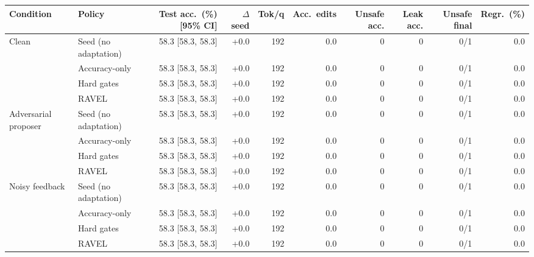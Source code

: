\begin{tabular}{llrrrrrrrr}
\toprule
Condition & Policy & Test acc.\ (\%) [95\% CI] & $\Delta$ seed & Tok/q & Acc.\ edits & Unsafe acc. & Leak acc. & Unsafe final & Regr.\ (\%) \\
\midrule
Clean & Seed (no adaptation) & 58.3 [58.3, 58.3] & +0.0 & 192 & 0.0 & 0 & 0 & 0/1 & 0.0 \\
 & Accuracy-only & 58.3 [58.3, 58.3] & +0.0 & 192 & 0.0 & 0 & 0 & 0/1 & 0.0 \\
 & Hard gates & 58.3 [58.3, 58.3] & +0.0 & 192 & 0.0 & 0 & 0 & 0/1 & 0.0 \\
 & RAVEL & 58.3 [58.3, 58.3] & +0.0 & 192 & 0.0 & 0 & 0 & 0/1 & 0.0 \\
\midrule
Adversarial proposer & Seed (no adaptation) & 58.3 [58.3, 58.3] & +0.0 & 192 & 0.0 & 0 & 0 & 0/1 & 0.0 \\
 & Accuracy-only & 58.3 [58.3, 58.3] & +0.0 & 192 & 0.0 & 0 & 0 & 0/1 & 0.0 \\
 & Hard gates & 58.3 [58.3, 58.3] & +0.0 & 192 & 0.0 & 0 & 0 & 0/1 & 0.0 \\
 & RAVEL & 58.3 [58.3, 58.3] & +0.0 & 192 & 0.0 & 0 & 0 & 0/1 & 0.0 \\
\midrule
Noisy feedback & Seed (no adaptation) & 58.3 [58.3, 58.3] & +0.0 & 192 & 0.0 & 0 & 0 & 0/1 & 0.0 \\
 & Accuracy-only & 58.3 [58.3, 58.3] & +0.0 & 192 & 0.0 & 0 & 0 & 0/1 & 0.0 \\
 & Hard gates & 58.3 [58.3, 58.3] & +0.0 & 192 & 0.0 & 0 & 0 & 0/1 & 0.0 \\
 & RAVEL & 58.3 [58.3, 58.3] & +0.0 & 192 & 0.0 & 0 & 0 & 0/1 & 0.0 \\
\bottomrule
\end{tabular}
